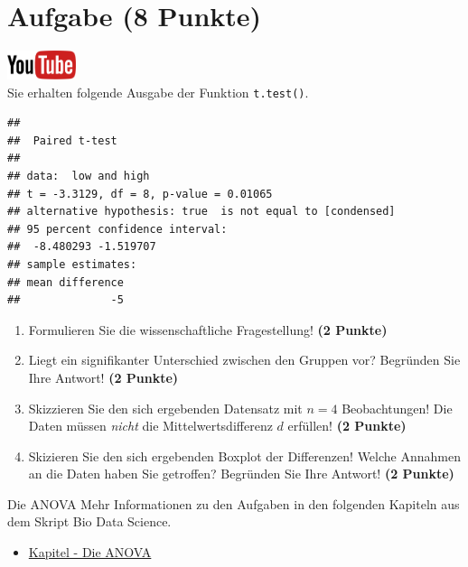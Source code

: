 \documentclass[a4paper, 9pt]{scrartcl}\usepackage[]{graphicx}\usepackage[]{xcolor}
\makeatletter
\newenvironment{kframe}{%
 \def\at@end@of@kframe{}%
 \ifinner\ifhmode%
  \def\at@end@of@kframe{\end{minipage}}%
  \begin{minipage}{\columnwidth}%
 \fi\fi%
 \def\FrameCommand##1{\hskip\@totalleftmargin \hskip-\fboxsep
 \colorbox{shadecolor}{##1}\hskip-\fboxsep
     \hskip-\linewidth \hskip-\@totalleftmargin \hskip\columnwidth}%
 \MakeFramed {\advance\hsize-\width
   \@totalleftmargin\z@ \linewidth\hsize
   \@setminipage}}%
 {\par\unskip\endMakeFramed%
 \at@end@of@kframe}
\newenvironment{knitrout}{}{} %
\makeatother
\begin{document}
\clearpage

\section{Aufgabe \hfill (8 Punkte)}

\hfill\href{https://youtu.be/kHmfEmU6lrk}{\includegraphics[width =
  2cm]{img/youtube}}\\[1Ex]


Sie erhalten folgende \Rlogo Ausgabe der Funktion \texttt{t.test()}.

\begin{knitrout}
\color{fgcolor}\begin{kframe}
\begin{verbatim}
## 
## 	Paired t-test
## 
## data:  low and high
## t = -3.3129, df = 8, p-value = 0.01065
## alternative hypothesis: true  is not equal to [condensed]
## 95 percent confidence interval:
##  -8.480293 -1.519707
## sample estimates:
## mean difference 
##              -5
\end{verbatim}
\end{kframe}
\end{knitrout}


\begin{enumerate}
  \item Formulieren Sie die wissenschaftliche Fragestellung! \textbf{(2
Punkte)}
\item Liegt ein signifikanter Unterschied zwischen den Gruppen vor?
  Begr{\"u}nden Sie Ihre Antwort! \textbf{(2 Punkte)}
\item Skizzieren Sie den sich ergebenden Datensatz mit $n = 4$
  Beobachtungen! Die Daten m{\"u}ssen \textit{nicht} die Mittelwertsdifferenz
  $d$ erf{\"u}llen! \textbf{(2 Punkte)} 
\item Skizieren Sie den sich ergebenden Boxplot der Differenzen! Welche Annahmen an die Daten haben Sie getroffen? Begr{\"u}nden Sie Ihre Antwort! \textbf{(2 Punkte)} 
\end{enumerate}
 
\clearpage
\begin{graybox}{Die ANOVA}
Mehr Informationen zu den Aufgaben in den folgenden Kapiteln aus dem Skript Bio Data Science.
  \begin{itemize}
  \item \href{https://jkruppa.github.io/stat-tests-anova.html}{Kapitel - Die ANOVA}
  \end{itemize}
\end{graybox}
\clearpage
\end{document}
